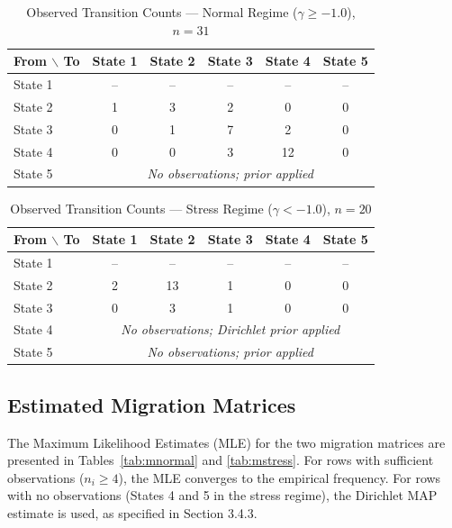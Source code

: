 \documentclass[12pt,a4paper]{article}
\begin{document}
\begin{table}[H]
\centering
\caption{Observed Transition Counts --- Normal Regime ($\gamma \geq -1.0$), $n = 31$}
\label{tab:count_normal}
\begin{tabular}{@{}lccccc@{}}
\toprule
\textbf{From $\backslash$ To} & \textbf{State 1} & \textbf{State 2} & \textbf{State 3} & \textbf{State 4} & \textbf{State 5} \\
\midrule
State 1 & -- & -- & -- & -- & -- \\
State 2 & 1 & 3 & 2 & 0 & 0 \\
State 3 & 0 & 1 & 7 & 2 & 0 \\
State 4 & 0 & 0 & 3 & 12 & 0 \\
State 5 & \multicolumn{5}{c}{\textit{No observations; prior applied}} \\
\bottomrule
\end{tabular}
\end{table}

\begin{table}[H]
\centering
\caption{Observed Transition Counts --- Stress Regime ($\gamma < -1.0$), $n = 20$}
\label{tab:count_stress}
\begin{tabular}{@{}lccccc@{}}
\toprule
\textbf{From $\backslash$ To} & \textbf{State 1} & \textbf{State 2} & \textbf{State 3} & \textbf{State 4} & \textbf{State 5} \\
\midrule
State 1 & -- & -- & -- & -- & -- \\
State 2 & 2 & 13 & 1 & 0 & 0 \\
State 3 & 0 & 3 & 1 & 0 & 0 \\
State 4 & \multicolumn{5}{c}{\textit{No observations; Dirichlet prior applied}} \\
State 5 & \multicolumn{5}{c}{\textit{No observations; prior applied}} \\
\bottomrule
\end{tabular}
\end{table}

\subsection{Estimated Migration Matrices}

The Maximum Likelihood Estimates (MLE) for the two migration matrices are presented in Tables~\ref{tab:mnormal} and \ref{tab:mstress}. For rows with sufficient observations ($n_i \geq 4$), the MLE converges to the empirical frequency. For rows with no observations (States 4 and 5 in the stress regime), the Dirichlet MAP estimate is used, as specified in Section 3.4.3.
\end{document}
